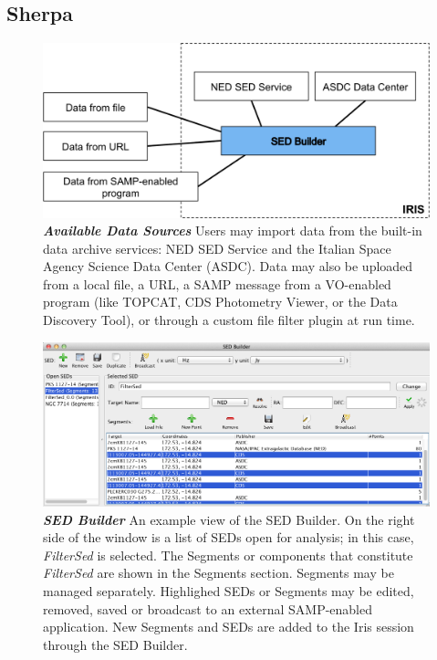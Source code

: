 \documentclass[preprint,12pt,3p]{elsarticle}
\begin{document}
\subsection{Sherpa}
\label{subsec:sherpa}





\begin{figure}[h!]
\begin{center}
\includegraphics[width=0.7\columnwidth]{figures/iris_data_sources2/iris_data_sources2.png}
\caption{\textit{\textbf{\label{fig:data_sources} Available Data Sources}}\textit{}\textbf{}\textit{} Users may import data from the built-in data archive services: NED SED Service and the Italian Space Agency Science Data Center (ASDC). Data may also be uploaded from a local file, a URL, a SAMP message from a VO-enabled program (like TOPCAT, CDS Photometry Viewer, or the Data Discovery Tool), or through a custom file filter plugin at run time.}
\end{center}
\end{figure}

\begin{figure}[h!]
\begin{center}
\includegraphics[width=0.7\columnwidth]{figures/sed_builder/sed_builder.png}
\caption{\textit{\textbf{\label{fig:sed_builder} SED Builder}} An example view of the SED Builder. On the right side of the window is a list of SEDs open for analysis; in this case, \textit{FilterSed} is selected. The Segments or components that constitute \textit{FilterSed} are shown in the Segments section. Segments may be managed separately. Highlighed SEDs or Segments may be edited, removed, saved or broadcast to an external SAMP-enabled application. New Segments and SEDs are added to the Iris session through the SED Builder. }
\end{center}
\end{figure}
\end{document}
